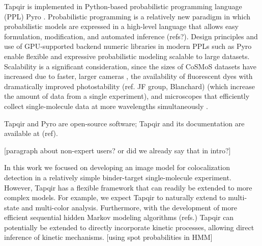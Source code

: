 Tapqir is implemented in Python-based probabilistic programming language (PPL) Pyro \cite{Bingham2019-qy}. Probabilistic programming is a relatively new paradigm in which probabilistic models are expressed in a high-level language that allows easy formulation, modification, and automated inference (refs?). Design principles and use of GPU-supported backend numeric libraries in modern PPLs such as Pyro enable flexible and expressive probabilistic modeling scalable to large datasets. Scalability is a significant consideration, since the sizes of CoSMoS datasets have increased due to faster, larger cameras \cite{Quan2011-cg}, the availability of fluorescent dyes with dramatically improved photostability (ref. JF group, Blanchard) (which increase the amount of data from a single experiment), and microscopes that efficiently collect single-molecule data at more wavelengths simultaneously \cite{Friedman2006-kb}. 

Tapqir and Pyro are open-source software; Tapqir and its documentation are available at (ref).


[paragraph about non-expert users?  or did we already say that in intro?]

In this work we focused on developing an image model for colocalization detection in a relatively simple binder-target single-molecule experiment. However, Tapqir has a flexible framework that can readily be extended to more complex models. For example, we expect Tapqir to naturally extend to multi-state and multi-color analysis. Furthermore, with the development of more efficient sequential hidden Markov modeling algorithms (refs.) Tapqir can potentially be extended to directly incorporate kinetic processes, allowing direct inference of kinetic mechanisms. [using spot probabilities in HMM]



